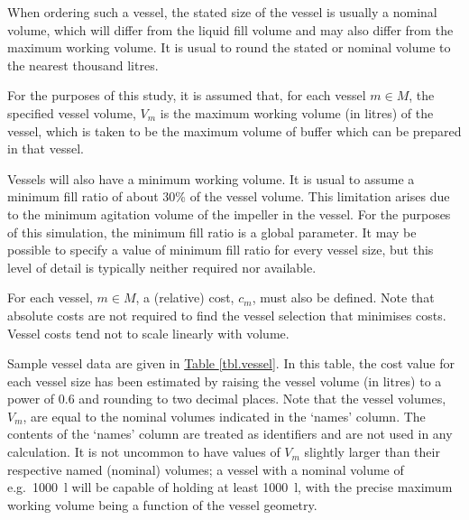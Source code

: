 When ordering such a vessel, the stated size of the vessel is usually a nominal
volume, which will differ from the liquid fill volume and may also differ from
the maximum working volume.
It is usual to round the stated or nominal volume to the nearest thousand
litres.

For the purposes of this study, it is assumed that, for each vessel $m \in M$,
the specified vessel volume, $V_{m}$ is the maximum working volume (in litres)
of the vessel, which is taken to be the maximum volume of buffer which can be
prepared in that vessel.

Vessels will also have a minimum working volume.
It is usual to assume a minimum fill ratio of about 30\% of the vessel volume.
This limitation arises due to the minimum agitation volume of the impeller in
the vessel.
For the purposes of this simulation, the minimum fill ratio is a global
parameter.
It may be possible to specify a value of minimum fill ratio for every vessel
size, but this level of detail is typically neither required nor available.

For each vessel, $m \in M$, a (relative) cost, $c_{m}$, must also be defined.
Note that absolute costs are not required to find the vessel selection that
minimises costs.
Vessel costs tend not to scale linearly with volume.

Sample vessel data are given in \hyperref[tbl.vessel]{Table \ref*{tbl.vessel}}.
In this table, the cost value for each vessel size has been estimated by
raising the vessel volume (in litres) to a power of 0.6 and rounding to two
decimal places.
Note that the vessel volumes, $V_{m}$, are equal to the nominal volumes
indicated in the `names' column.  The contents of the `names' column are
treated as identifiers and are not used in any calculation.
It is not uncommon to have values of $V_{m}$ slightly larger than their
respective named (nominal) volumes; a vessel with a nominal volume of e.g.\
\SI{1000}{\litre} will be capable of holding at least \SI{1000}{\litre}, with
the precise maximum working volume being a function of the vessel geometry.

